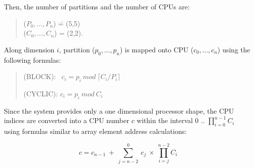 \documentclass{article}
\begin{document}
Then, the number of partitions and the number of CPUs are:

\begin{quote}
\begin{tabbing}
($P_0,\ldots,P_n$) \= = (5,5) \\
($C_0,\ldots,C_n$) \> = (2,2).
\end{tabbing}
\end{quote}

Along dimension $i$, partition ($p_0,\ldots,p_n$) is mapped onto CPU
($c_0,\ldots,c_n$) using the following formulas:

\begin{quote}
(BLOCK):~ $c_i = p_i~mod~\lceil C_i / P_i  \rceil$ 

(CYCLIC): $c_i = p_i~mod~C_i$ 
\end{quote}

Since the system provides only a one dimensional processor shape, the
CPU indices are converted into a CPU number $c$ within
the interval 0 .. $\prod_{i=0}^{n-1}C_i$ using formulas similar
to array element address calculations:

\[c = c_{n-1}~+~\sum_{j=n-2}^{0}~c_j~\times~\prod_{i=j}^{n-2}C_i\]

\newpage


\end{document}
